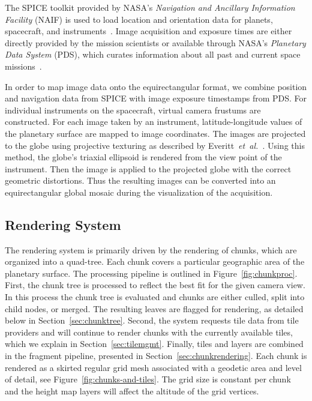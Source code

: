 \documentclass[journal]{vgtc}                %
\newcommand{\fig}[1]{Figure~\ref{fig:#1}}
\newcommand{\etal}{\emph{et~al.}}
\begin{document}
The SPICE toolkit provided by NASA's \emph{Navigation and Ancillary Information Facility} (NAIF) is used to load location and orientation data for planets, spacecraft, and instruments~\cite{acton1996ancillary}.
Image acquisition and exposure times are either directly provided by the mission scientists or available through NASA's \emph{Planetary Data System} (PDS), which curates information about all past and current space missions~\cite{mcmahon1996overview}.

In order to map image data onto the equirectangular format, we combine position and navigation data from SPICE with image exposure timestamps from PDS. For individual instruments on the spacecraft, virtual camera frustums are constructed. For each image taken by an instrument, latitude-longitude values of the planetary surface are mapped to image coordinates.
The images are projected to the globe using projective texturing as described by Everitt~\etal~\cite{Everitt:2001tg}.
Using this method, the globe's triaxial ellipsoid is rendered from the view point of the instrument. Then the image is applied to the projected globe with the correct geometric distortions. Thus the resulting images can be converted into an equirectangular global mosaic during the visualization of the acquisition.

\subsection{Rendering System} \label{sec:renderingsystem}
The rendering system is primarily driven by the rendering of chunks, which are organized into a quad-tree. Each chunk covers a particular geographic area of the planetary surface. The processing pipeline is outlined in \fig{chunkproc}. First, the chunk tree is processed to reflect the best fit for the given camera view. In this process the chunk tree is evaluated and chunks are either culled, split into child nodes, or merged. The resulting leaves are flagged for rendering, as detailed below in Section~\ref{sec:chunktree}. Second, the system requests tile data from tile providers and will continue to render chunks with the currently available tiles, which we explain in Section~\ref{sec:tilemgmt}. Finally, tiles and layers are combined in the fragment pipeline, presented in Section~\ref{sec:chunkrendering}.
Each chunk is rendered as a skirted regular grid mesh associated with a geodetic area and level of detail, see \fig{chunks-and-tiles}. The grid size is constant per chunk and the height map layers will affect the altitude of the grid vertices.
\end{document}
